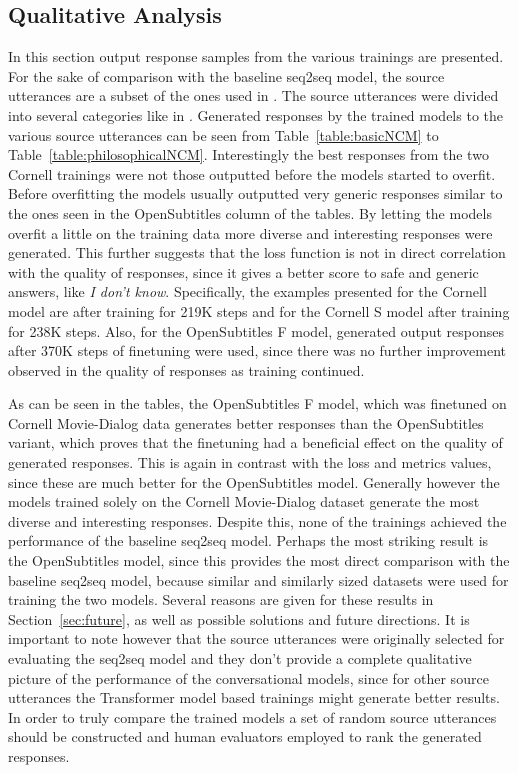 \documentclass[12pt]{article}
\begin{document}
\newpage\subsection{Qualitative Analysis} \label{ssec:52}
In this section output response samples from the various trainings are presented. For the sake of comparison with the baseline seq2seq model, the source utterances are a subset of the ones used in \cite{Vinyals:2015}. The source utterances were divided into several categories like in \cite{Vinyals:2015}. Generated responses by the trained models to the various source utterances can be seen from Table~\ref{table:basicNCM} to Table~\ref{table:philosophicalNCM}. Interestingly the best responses from the two Cornell trainings were not those outputted before the models started to overfit. Before overfitting the models usually outputted very generic responses similar to the ones seen in the OpenSubtitles column of the tables. By letting the models overfit a little on the training data more diverse and interesting responses were generated. This further suggests that the loss function is not in direct correlation with the quality of responses, since it gives a better score to safe and generic answers, like \textit{I don't know}. Specifically, the examples presented for the Cornell model are after training for 219K steps and for the Cornell S model after training for 238K steps. Also, for the OpenSubtitles F model, generated output responses after 370K steps of finetuning were used, since there was no further improvement observed in the quality of responses as training continued.

As can be seen in the tables, the OpenSubtitles F model, which was finetuned on Cornell Movie-Dialog data generates better responses than the OpenSubtitles variant, which proves that the finetuning had a beneficial effect on the quality of generated responses. This is again in contrast with the loss and metrics values, since these are much better for the OpenSubtitles model. Generally however the models trained solely on the Cornell Movie-Dialog dataset generate the most diverse and interesting responses. Despite this, none of the trainings achieved the performance of the baseline seq2seq model. Perhaps the most striking result is the OpenSubtitles model, since this provides the most direct comparison with the baseline seq2seq model, because similar and similarly sized datasets were used for training the two models. Several reasons are given for these results in Section~\ref{sec:future}, as well as possible solutions and future directions. It is important to note however that the source utterances were originally selected for evaluating the seq2seq model and they don't provide a complete qualitative picture of the performance of the conversational models, since for other source utterances the Transformer model based trainings might generate better results. In order to truly compare the trained models a set of random source utterances should be constructed and human evaluators employed to rank the generated responses.
\end{document}
